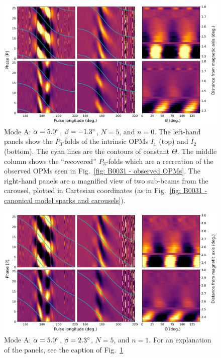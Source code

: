 \begin{figure}
	\begin{center}
		\includegraphics[width=\atlasHeightFrac\textwidth]{Figures/B0031/atlas/A_517005005000_plots}
		\caption[Atlas results: Mode A -- $\alpha=5.0\degr$, $\beta=-1.3\degr$, $N=5$, $n=0$]{Mode A: $\alpha=5.0\degr$, $\beta=-1.3\degr$, $N=5$, and $n=0$. The left-hand panels show the $P_3$-folds of the intrinsic OPMs $I_1$ (top) and $I_2$ (bottom). The cyan lines are the contours of constant $\Theta$. The middle column shows the ``recovered'' $P_3$-folds which are a recreation of the observed OPMs seen in Fig.~\ref{fig: B0031 - observed OPMs}. The right-hand panels are a magnified view of two sub-beams from the carousel, plotted in Cartesian coordinates (as in Fig.~\ref{fig: B0031 - canonical model sparks and carousels}). }
		\label{fig: atlas - MASTER}
	\end{center}
\end{figure}

\begin{figure}
	\begin{center}
		\includegraphics[width=\atlasHeightFrac\textwidth]{Figures/B0031/atlas/A_517005005001_plots}
		\caption[Atlas results: Mode A -- $\alpha=5.0\degr$, $\beta=2.3\degr$, $N=5$, $n=1$]{Mode A: $\alpha=5.0\degr$, $\beta=2.3\degr$, $N=5$, and $n=1$. For an explanation of the panels, see the caption of Fig.~\ref{fig: atlas - MASTER} }
		\label{fig: atlas - A_517005005001}
	\end{center}
\end{figure}

